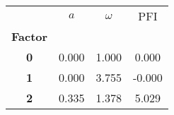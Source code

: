 \begin{tabular}{cccc}
\toprule
{} &   $a$ &  $\omega$ &    PFI \\
\textbf{Factor} &       &           &        \\
\midrule
\textbf{0     } & 0.000 &     1.000 &  0.000 \\
\textbf{1     } & 0.000 &     3.755 & -0.000 \\
\textbf{2     } & 0.335 &     1.378 &  5.029 \\
\bottomrule
\end{tabular}
